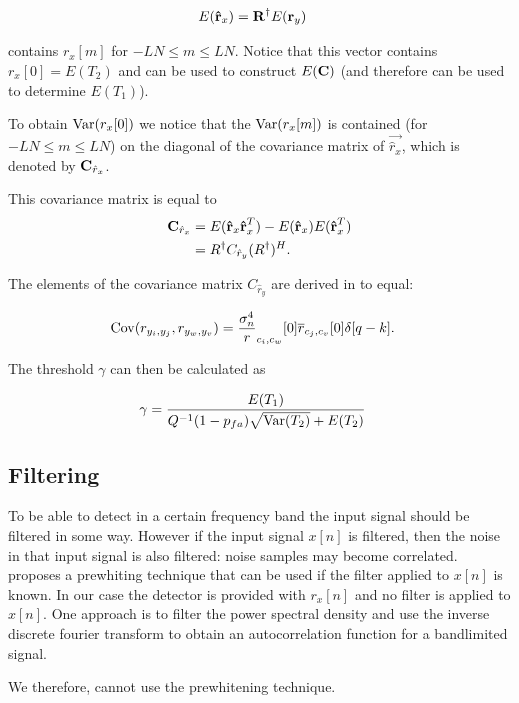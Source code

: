 \documentclass[a4paper, openany, oneside]{memoir}
\begin{document}
\begin{align*}
E(\boldsymbol{\mathbf{\hat{r}}}_x) &= \boldsymbol{\mathbf{R}}^{\dagger}E(\boldsymbol{\mathbf{r}}_y)
\end{align*}

contains $r_x[m]$ for $-LN \leq m \leq LN$. Notice that this vector contains $r_x[0] = E(T_2)$ and can be used to construct $E(\boldsymbol{\mathbf{C}})$ (and therefore can be used to determine $E(T_1)$).

To obtain $\operatorname{Var}(r_x[0])$ we notice that the $\operatorname{Var}(r_x[m])$ is contained (for $-LN \leq m \leq LN$) on the diagonal of the covariance matrix of $\vec{\hat{r}_x}$, which is denoted by $\boldsymbol{\mathbf{C}}_{\hat{r}_x}$.

This covariance matrix is equal to
\begin{align*}
\boldsymbol{\mathbf{C}}_{\hat{r}_x} &= E(\boldsymbol{\mathbf{\hat{r}}}_x\boldsymbol{\mathbf{\hat{r}}}_x^T) - E(\boldsymbol{\mathbf{\hat{r}}}_x) E(\boldsymbol{\mathbf{\hat{r}}}_x^T)\\
&= R^{\dagger}C_{\hat{r}_y}(R^{\dagger})^H.
\end{align*}

The elements of the covariance matrix $C_{\hat{r}_y}$ are derived in \cite{ariananda2012compressive} to equal:

\begin{align}
\operatorname{Cov}(r_{{y_i},y_j}, r_{{y_w},y_v}) &= \frac{\sigma_n^4} r_{c_i,c_w}[0]\overline{r}_{c_j,c_v}[0]\delta[q-k].
\end{align}

The threshold $\gamma$ can then be calculated as

\begin{align*}
\gamma &= \frac{E(T_1)}{Q^{-1}(1-p_{fa})\sqrt{\operatorname{Var}(T_2)}+E(T_2)}
\end{align*}

\subsection{Filtering}
To be able to detect in a certain frequency band the input signal should be filtered in some way. However if the input signal $x[n]$ is filtered, then the noise in that input signal is also filtered: noise samples may become correlated. \cite{zheng2009spectrum} proposes a prewhiting technique
that can be used if the filter applied to $x[n]$ is known. In our case the detector is provided with $r_x[n]$ and no filter is applied to $x[n]$. One approach is to filter the power spectral density and use the inverse discrete fourier transform to obtain an autocorrelation function for a bandlimited signal.

We therefore, cannot use the prewhitening technique. 


\end{document}
